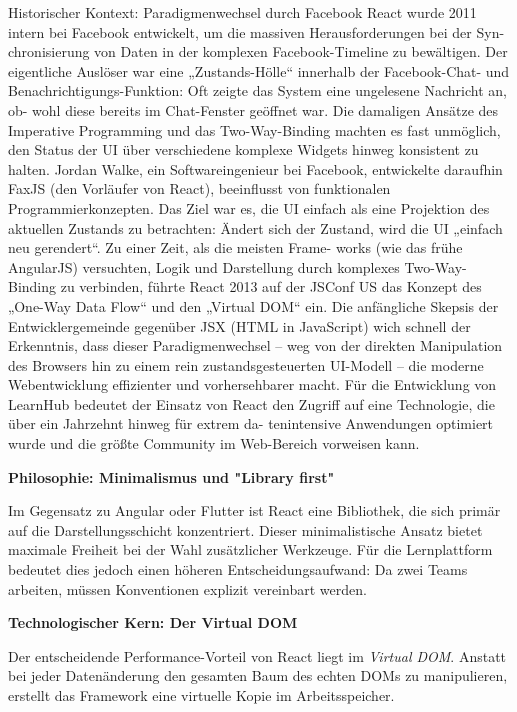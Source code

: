 Historischer Kontext: Paradigmenwechsel durch Facebook React wurde 2011
intern bei Facebook entwickelt, um die massiven Herausforderungen bei der Syn-
chronisierung von Daten in der komplexen Facebook-Timeline zu bewältigen. Der
eigentliche Auslöser war eine „Zustands-Hölle“ innerhalb der Facebook-Chat- und
Benachrichtigungs-Funktion: Oft zeigte das System eine ungelesene Nachricht an, ob-
wohl diese bereits im Chat-Fenster geöffnet war. Die damaligen Ansätze des Imperative
Programming und das Two-Way-Binding machten es fast unmöglich, den Status der UI
über verschiedene komplexe Widgets hinweg konsistent zu halten.
Jordan Walke, ein Softwareingenieur bei Facebook, entwickelte daraufhin FaxJS (den
Vorläufer von React), beeinflusst von funktionalen Programmierkonzepten. Das Ziel war
es, die UI einfach als eine Projektion des aktuellen Zustands zu betrachten: Ändert sich
der Zustand, wird die UI „einfach neu gerendert“. Zu einer Zeit, als die meisten Frame-
works (wie das frühe AngularJS) versuchten, Logik und Darstellung durch komplexes
Two-Way-Binding zu verbinden, führte React 2013 auf der JSConf US das Konzept
des „One-Way Data Flow“ und den „Virtual DOM“ ein. Die anfängliche Skepsis der
Entwicklergemeinde gegenüber JSX (HTML in JavaScript) wich schnell der Erkenntnis,
dass dieser Paradigmenwechsel – weg von der direkten Manipulation des Browsers hin
zu einem rein zustandsgesteuerten UI-Modell – die moderne Webentwicklung effizienter
und vorhersehbarer macht. Für die Entwicklung von LearnHub bedeutet der Einsatz
von React den Zugriff auf eine Technologie, die über ein Jahrzehnt hinweg für extrem da-
tenintensive Anwendungen optimiert wurde und die größte Community im Web-Bereich
vorweisen kann.

\vspace{0.7cm}

\textbf{Philosophie: Minimalismus und "Library first"}

Im Gegensatz zu Angular oder Flutter ist React eine Bibliothek, die sich primär auf die Darstellungsschicht konzentriert. Dieser minimalistische Ansatz bietet maximale Freiheit bei der Wahl zusätzlicher Werkzeuge. Für die Lernplattform bedeutet dies jedoch einen höheren Entscheidungsaufwand: Da zwei Teams arbeiten, müssen Konventionen explizit vereinbart werden.

\vspace{0.7cm}
\textbf{Technologischer Kern: Der Virtual DOM}

Der entscheidende Performance-Vorteil von React liegt im \textit{Virtual DOM}. Anstatt bei jeder Datenänderung den gesamten Baum des echten DOMs zu manipulieren, erstellt das Framework eine virtuelle Kopie im Arbeitsspeicher.

